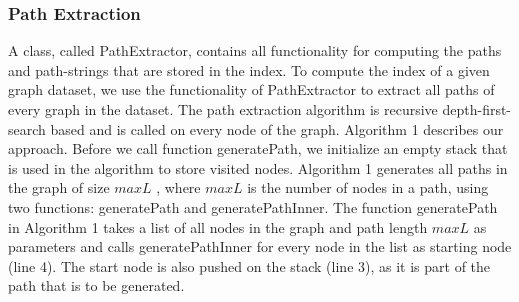 \documentclass{l4proj}
\begin{document}
\subsubsection{Path Extraction}
\label{path-index:path-extraction}
A class, called \textrm{PathExtractor}, contains all functionality for computing the paths and path-strings that are stored in the index. To compute the index of a given graph dataset, we use the functionality of \textrm{PathExtractor} to extract all paths of every graph in the dataset. The path extraction algorithm is recursive depth-first-search based and is called on every node of the graph. Algorithm 1 describes our approach. Before we call function \textrm{generatePath}, we initialize an empty stack that is used in the algorithm to store visited nodes. \textrm{Algorithm 1} generates all paths in the graph of size $maxL$ , where $maxL$ is the number of nodes in a path, using two functions: \textrm{generatePath} and \textrm{generatePathInner}. The function \textrm{generatePath} in \textrm{Algorithm 1} takes a list of all nodes in the graph and path length $maxL$ as parameters and calls \textrm{generatePathInner} for every node in the list as starting node (line 4). The start node is also pushed on the stack (line 3), as it is part of the path that is to be generated. \par
\end{document}
